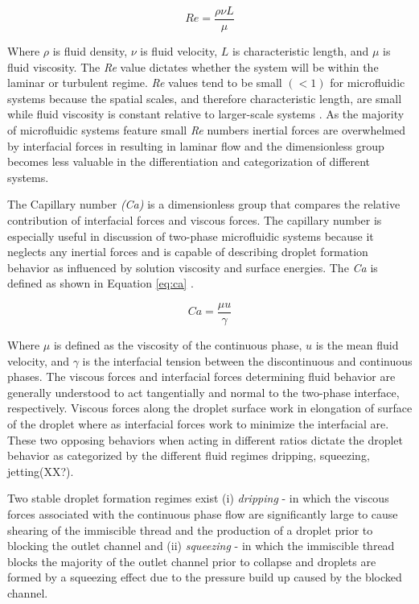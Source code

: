 \begin{equation}
Re =\frac {\rho \nu L}{\mu}
\label{eq:reynolds}
\end{equation}

Where $\rho$ is fluid density, $\nu$ is fluid velocity, $L$ is characteristic length, and $\mu$ is fluid viscosity. The \emph{Re} value dictates whether the system will be within the laminar or turbulent regime. \emph{Re} values tend to be small $(< 1)$ for microfluidic systems because the spatial scales, and therefore characteristic length, are small while fluid viscosity is constant relative to larger-scale systems \cite{D??azNafr??a2013}. As the majority of microfluidic systems feature small \emph{Re} numbers inertial forces are overwhelmed by interfacial forces in resulting in laminar flow and the dimensionless group becomes less valuable in the differentiation and categorization of different systems\cite{Shui2007}.

The Capillary number \emph{(Ca)} is a dimensionless group that compares the relative contribution of interfacial forces and viscous forces. The capillary number is especially useful in discussion of two-phase microfluidic systems because it neglects any inertial forces and is capable of describing droplet formation behavior as influenced by solution viscosity and surface energies.  The \emph{Ca} is defined as shown in Equation \vref{eq:ca} \cite{D??azNafr??a2013}.

\begin{equation}
Ca =\frac {\mu u}{\gamma}
\label{eq:ca}
\end{equation}

Where $\mu$ is defined as the viscosity of the continuous phase, $u$ is the mean fluid velocity, and $\gamma$ is the interfacial tension between the discontinuous and continuous phases. The viscous forces and interfacial forces determining fluid behavior are generally understood to act tangentially and normal to the two-phase interface, respectively. Viscous forces along the droplet surface work in elongation of surface of the droplet where as interfacial forces work to minimize the interfacial are. These two opposing behaviors when acting in different ratios dictate the droplet behavior as categorized by the different fluid regimes dripping, squeezing, jetting(XX?)\cite{Shui2007}.

Two stable droplet formation regimes exist (i) \emph{dripping} - in which the viscous forces associated with the continuous phase flow are significantly large to cause shearing of the immiscible thread and the production of a droplet prior to blocking the outlet channel and (ii) \emph{squeezing} - in which the immiscible thread blocks the majority of the outlet channel prior to collapse and droplets are formed by a squeezing effect due to the pressure build up caused by the blocked channel.

